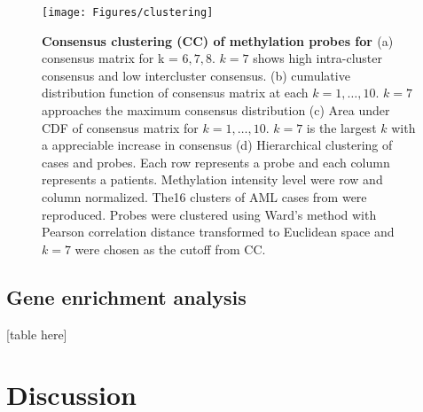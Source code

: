\documentclass{article}
\begin{document}
\begin{figure}[ht!]
\centering
\texttt{[image: Figures/clustering]}
\caption{\textbf{Consensus clustering (CC) of methylation probes for \citet{figueroa2010dna}} (a) consensus matrix for k = $6, 7, 8$. $k = 7$ shows high intra-cluster consensus and low intercluster consensus. (b) cumulative distribution function of consensus matrix at each $k = 1, \dots, 10$. $k = 7$ approaches the maximum consensus distribution (c) Area under CDF of consensus matrix for $k = 1, \dots, 10$. $k = 7$ is the largest $k$ with a appreciable increase in consensus (d) Hierarchical clustering of cases and probes. Each row represents a probe and each column represents a patients. Methylation intensity level were row and column normalized. The16 clusters of AML cases from \citet{figueroa2010dna} were reproduced. Probes were clustered using Ward's method with Pearson correlation distance transformed to Euclidean space and $k=7$ were chosen as the cutoff from CC. }
\label{CC}
\end{figure}


\subsection{Gene enrichment analysis}
[table here]

\section{Discussion}



\end{document}

